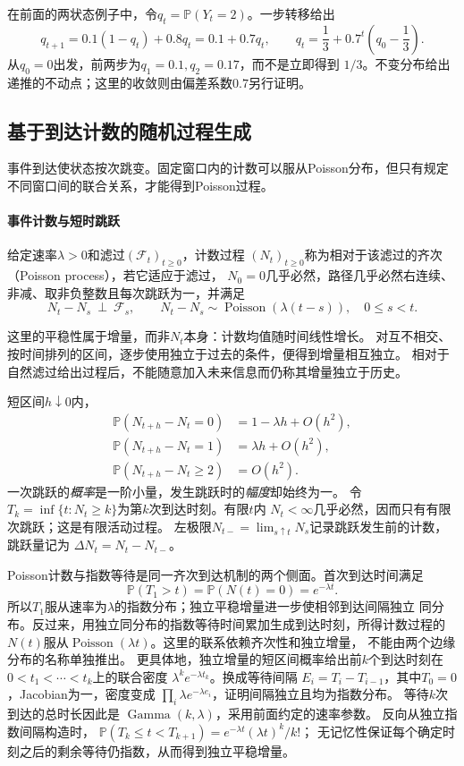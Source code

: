 在前面的两状态例子中，令\(q_t=\mathbb P(Y_t=2)\)。一步转移给出
\[
q_{t+1}=0.1(1-q_t)+0.8q_t=0.1+0.7q_t,
\qquad q_t=\frac13+0.7^t\left(q_0-\frac13\right).
\]
从\(q_0=0\)出发，前两步为\(q_1=0.1,q_2=0.17\)，而不是立即得到
\(1/3\)。不变分布给出递推的不动点；这里的收敛则由偏差系数\(0.7\)另行证明。

\subsection{基于到达计数的随机过程生成}
\label{sec:rv-poisson}
事件到达使状态按次跳变。固定窗口内的计数可以服从Poisson分布，但只有规定不同窗口间的联合关系，才能得到Poisson过程。

\paragraph{事件计数与短时跳跃}
\begin{definition}[齐次Poisson过程]
\label{def:rv-poisson-process}
给定速率\(\lambda>0\)和滤过\((\mathcal F_t)_{t\geq0}\)，计数过程
\((N_t)_{t\geq0}\)称为相对于该滤过的齐次（Poisson process），若它适应于滤过，
\(N_0=0\)几乎必然，路径几乎必然右连续、非减、取非负整数且每次跳跃为一，并满足
\[
N_t-N_s\ \perp\ \mathcal F_s,\qquad
N_t-N_s\sim\operatorname{Poisson}(\lambda(t-s)),
\quad 0\leq s<t.
\]
\end{definition}
这里的平稳性属于增量，而非\(N_t\)本身：计数均值随时间线性增长。
对互不相交、按时间排列的区间，逐步使用独立于过去的条件，便得到增量相互独立。
相对于自然滤过给出过程后，不能随意加入未来信息而仍称其增量独立于历史。

短区间\(h\downarrow0\)内，
\[
\begin{aligned}
\mathbb P(N_{t+h}-N_t=0)&=1-\lambda h+O(h^2),\\
\mathbb P(N_{t+h}-N_t=1)&=\lambda h+O(h^2),\\
\mathbb P(N_{t+h}-N_t\geq2)&=O(h^2).
\end{aligned}
\]
一次跳跃的\emph{概率}是一阶小量，发生跳跃时的\emph{幅度}却始终为一。
令\(T_k=\inf\{t:N_t\geq k\}\)为第\(k\)次到达时刻。有限\(t\)内
\(N_t<\infty\)几乎必然，因而只有有限次跳跃；这是有限活动过程。
左极限\(N_{t-}=\lim_{s\uparrow t}N_s\)记录跳跃发生前的计数，跳跃量记为
\(\Delta N_t=N_t-N_{t-}\)。

Poisson计数与指数等待是同一齐次到达机制的两个侧面。首次到达时间满足
\[
  \mathbb{P}(T_1>t)
  =
  \mathbb{P}(N(t)=0)
  =
  e^{-\lambda t}.
\]
所以\(T_1\)服从速率为\(\lambda\)的指数分布；独立平稳增量进一步使相邻到达间隔独立
同分布。反过来，用独立同分布的指数等待时间累加生成到达时刻，所得计数过程的
\(N(t)\)服从\(\operatorname{Poisson}(\lambda t)\)。这里的联系依赖齐次性和独立增量，
不能由两个边缘分布的名称单独推出。
更具体地，独立增量的短区间概率给出前\(k\)个到达时刻在
\(0<t_1<\cdots<t_k\)上的联合密度
\(\lambda^k e^{-\lambda t_k}\)。换成等待间隔
\(E_i=T_i-T_{i-1}\)，其中\(T_0=0\)，Jacobian为一，密度变成
\(\prod_i\lambda e^{-\lambda e_i}\)，证明间隔独立且均为指数分布。
等待\(k\)次到达的总时长因此是
\(\operatorname{Gamma}(k,\lambda)\)，采用前面约定的速率参数。
反向从独立指数间隔构造时，
\(\mathbb P(T_k\leq t<T_{k+1})=e^{-\lambda t}(\lambda t)^k/k!\)；
无记忆性保证每个确定时刻之后的剩余等待仍指数，从而得到独立平稳增量。

